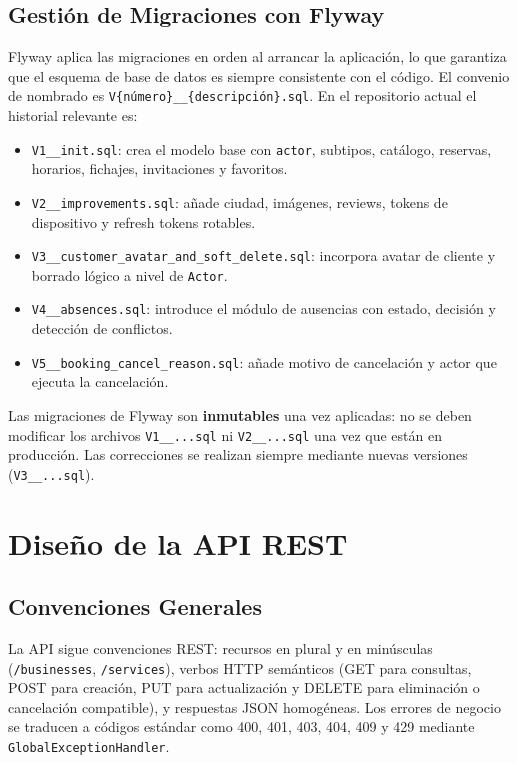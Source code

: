 \documentclass[12pt,a4paper,twoside]{report}
\begin{document}
\subsection{Gestión de Migraciones con Flyway}

Flyway aplica las migraciones en orden al arrancar la aplicación, lo que garantiza que el esquema de base de datos es siempre consistente con el código. El convenio de nombrado es \texttt{V\{número\}\_\_\{descripción\}.sql}. En el repositorio actual el historial relevante es:

\begin{itemize}
  \item \texttt{V1\_\_init.sql}: crea el modelo base con \texttt{actor}, subtipos, catálogo, reservas, horarios, fichajes, invitaciones y favoritos.
  \item \texttt{V2\_\_improvements.sql}: añade ciudad, imágenes, reviews, tokens de dispositivo y refresh tokens rotables.
  \item \texttt{V3\_\_customer\_avatar\_and\_soft\_delete.sql}: incorpora avatar de cliente y borrado lógico a nivel de \texttt{Actor}.
  \item \texttt{V4\_\_absences.sql}: introduce el módulo de ausencias con estado, decisión y detección de conflictos.
  \item \texttt{V5\_\_booking\_cancel\_reason.sql}: añade motivo de cancelación y actor que ejecuta la cancelación.
\end{itemize}

\begin{tcolorbox}[notaStyle]
Las migraciones de Flyway son \textbf{inmutables} una vez aplicadas: no se deben modificar los archivos \texttt{V1\_\_...sql} ni \texttt{V2\_\_...sql} una vez que están en producción. Las correcciones se realizan siempre mediante nuevas versiones (\texttt{V3\_\_...sql}).
\end{tcolorbox}

\section{Diseño de la API REST}

\subsection{Convenciones Generales}

La API sigue convenciones REST: recursos en plural y en minúsculas (\texttt{/businesses}, \texttt{/services}), verbos HTTP semánticos (GET para consultas, POST para creación, PUT para actualización y DELETE para eliminación o cancelación compatible), y respuestas JSON homogéneas. Los errores de negocio se traducen a códigos estándar como 400, 401, 403, 404, 409 y 429 mediante \texttt{GlobalExceptionHandler}.
\end{document}

